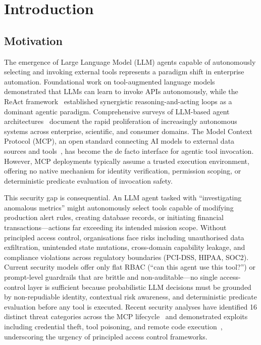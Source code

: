 \documentclass[10pt,a4paper,twocolumn]{article}
\begin{document}
\begin{abstract}
\end{abstract}

\section{Introduction}
\label{sec:introduction}

\subsection{Motivation}
\label{sec:motivation}

The emergence of Large Language Model (LLM) agents capable of autonomously selecting and invoking external tools represents a paradigm shift in enterprise automation. Foundational work on tool-augmented language models~\cite{schick2023toolformer} demonstrated that LLMs can learn to invoke APIs autonomously, while the ReAct framework~\cite{yao2023react} established synergistic reasoning-and-acting loops as a dominant agentic paradigm. Comprehensive surveys of LLM-based agent architectures~\cite{wang2024survey, xi2025rise} document the rapid proliferation of increasingly autonomous systems across enterprise, scientific, and consumer domains. The Model Context Protocol (MCP), an open standard connecting AI models to external data sources and tools~\cite{anthropic2024mcp}, has become the de facto interface for agentic tool invocation. However, MCP deployments typically assume a trusted execution environment, offering no native mechanism for identity verification, permission scoping, or deterministic predicate evaluation of invocation safety.

This security gap is consequential. An LLM agent tasked with ``investigating anomalous metrics'' might autonomously select tools capable of modifying production alert rules, creating database records, or initiating financial transactions---actions far exceeding its intended mission scope. Without principled access control, organisations face risks including unauthorised data exfiltration, unintended state mutations, cross-domain capability leakage, and compliance violations across regulatory boundaries (PCI-DSS, HIPAA, SOC2). Current security models offer only flat RBAC (``can this agent use this tool?'') or prompt-level guardrails that are brittle and non-auditable---no single access-control layer is sufficient because probabilistic LLM decisions must be grounded by non-repudiable identity, contextual risk awareness, and deterministic predicate evaluation before any tool is executed. Recent security analyses have identified 16 distinct threat categories across the MCP lifecycle~\cite{gupta2025security} and demonstrated exploits including credential theft, tool poisoning, and remote code execution~\cite{jamshidi2025securing}, underscoring the urgency of principled access control frameworks.
\end{document}
